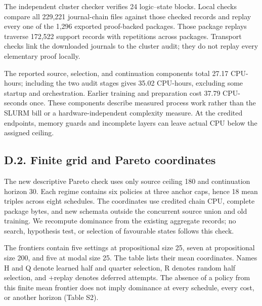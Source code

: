 \documentclass[pdflatex,sn-basic,Numbered]{sn-jnl}
\begin{document}
The independent cluster checker verifies 24 logic--state blocks. Local checks compare all 229,221 journal-chain files against those checked records and replay every one of the 1,296 exported proof-backed packages. Those package replays traverse 172,522 support records with repetitions across packages. Transport checks link the downloaded journals to the cluster audit; they do not replay every elementary proof locally.

The reported source, selection, and continuation components total 27.17 CPU-hours; including the two audit stages gives 35.02 CPU-hours, excluding some startup and orchestration. Earlier training and preparation cost 37.79 CPU-seconds once. These components describe measured process work rather than the SLURM bill or a hardware-independent complexity measure. At the credited endpoints, memory guards and incomplete layers can leave actual CPU below the assigned ceiling.

\subsection*{D.2. Finite grid and Pareto coordinates}\label{d.2.-finite-grid-and-pareto-coordinates}

The new descriptive Pareto check uses only source ceiling 180 and continuation horizon 30. Each regime contains six policies at three anchor caps, hence 18 mean triples across eight schedules. The coordinates use credited chain CPU, complete package bytes, and new schemata outside the concurrent source union and old training. We recompute dominance from the existing aggregate records; no search, hypothesis test, or selection of favourable states follows this check.

The frontiers contain five settings at propositional size 25, seven at propositional size 200, and five at modal size 25. The table lists their mean coordinates. Names H and Q denote learned half and quarter selection, R denotes random half selection, and +replay denotes deferred attempts. The absence of a policy from this finite mean frontier does not imply dominance at every schedule, every cost, or another horizon (Table S2).

\begingroup
\small
\setlength{\tabcolsep}{3pt}
\renewcommand{\arraystretch}{1.13}
\end{document}
